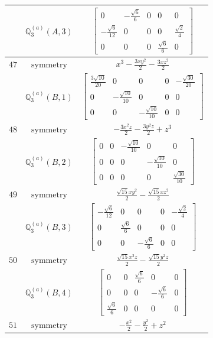 \documentclass[fleqn,8pt,landscape]{jsarticle}
\begin{document}
\begin{longtable}{ccc}
$  $ & $ \mathbb{Q}_{3}^{(a)}(A,3) $ & $ \begin{bmatrix} 0 & - \frac{\sqrt{6}}{6} & 0 & 0 & 0 \\ - \frac{\sqrt{6}}{12} & 0 & 0 & 0 & \frac{\sqrt{2}}{4} \\ 0 & 0 & 0 & \frac{\sqrt{6}}{6} & 0 \end{bmatrix} $ \\ \hline
$ 47 $ & $ \text{symmetry} $ & $ x^{3} - \frac{3 x y^{2}}{2} - \frac{3 x z^{2}}{2} $ \\
$  $ & $ \mathbb{Q}_{3}^{(a)}(B,1) $ & $ \begin{bmatrix} \frac{3 \sqrt{10}}{20} & 0 & 0 & 0 & - \frac{\sqrt{30}}{20} \\ 0 & - \frac{\sqrt{10}}{10} & 0 & 0 & 0 \\ 0 & 0 & - \frac{\sqrt{10}}{10} & 0 & 0 \end{bmatrix} $ \\ \hline
$ 48 $ & $ \text{symmetry} $ & $ - \frac{3 x^{2} z}{2} - \frac{3 y^{2} z}{2} + z^{3} $ \\
$  $ & $ \mathbb{Q}_{3}^{(a)}(B,2) $ & $ \begin{bmatrix} 0 & 0 & - \frac{\sqrt{10}}{10} & 0 & 0 \\ 0 & 0 & 0 & - \frac{\sqrt{10}}{10} & 0 \\ 0 & 0 & 0 & 0 & \frac{\sqrt{30}}{10} \end{bmatrix} $ \\ \hline
$ 49 $ & $ \text{symmetry} $ & $ \frac{\sqrt{15} x y^{2}}{2} - \frac{\sqrt{15} x z^{2}}{2} $ \\
$  $ & $ \mathbb{Q}_{3}^{(a)}(B,3) $ & $ \begin{bmatrix} - \frac{\sqrt{6}}{12} & 0 & 0 & 0 & - \frac{\sqrt{2}}{4} \\ 0 & \frac{\sqrt{6}}{6} & 0 & 0 & 0 \\ 0 & 0 & - \frac{\sqrt{6}}{6} & 0 & 0 \end{bmatrix} $ \\ \hline
$ 50 $ & $ \text{symmetry} $ & $ \frac{\sqrt{15} x^{2} z}{2} - \frac{\sqrt{15} y^{2} z}{2} $ \\
$  $ & $ \mathbb{Q}_{3}^{(a)}(B,4) $ & $ \begin{bmatrix} 0 & 0 & \frac{\sqrt{6}}{6} & 0 & 0 \\ 0 & 0 & 0 & - \frac{\sqrt{6}}{6} & 0 \\ \frac{\sqrt{6}}{6} & 0 & 0 & 0 & 0 \end{bmatrix} $ \\ \hline
$ 51 $ & $ \text{symmetry} $ & $ - \frac{x^{2}}{2} - \frac{y^{2}}{2} + z^{2} $ \\

\end{longtable}
\end{document}
